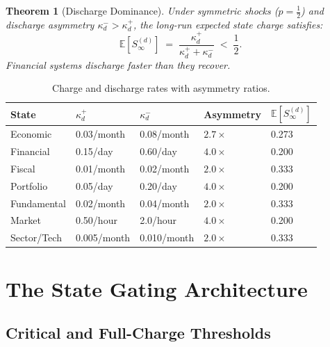 \documentclass[12pt,openany]{book}
\newcommand{\E}{\mathbb{E}}
\numberwithin{equation}{chapter}
\theoremstyle{plain}
\newtheorem{theorem}{Theorem}[chapter]
\theoremstyle{definition}
\theoremstyle{remark}
\def\mathcal#1{#1}%
\begin{document}
\begin{theorem}[Discharge Dominance]
\label{thm:discharge-dominance}
Under symmetric shocks ($p = \tfrac{1}{2}$) and discharge
asymmetry $\kappa_d^{-} > \kappa_d^{+}$, the long-run expected
state charge satisfies:
\begin{equation}
  \E\!\left[\mathcal{S}_\infty^{(d)}\right]
  \;=\;
  \frac{\kappa_d^{+}}{\kappa_d^{+} + \kappa_d^{-}}
  \;<\; \frac{1}{2}.
  \label{eq:discharge-dominance}
\end{equation}
Financial systems discharge faster than they recover.
\end{theorem}

\begin{table}[H]
\centering
\caption{Charge and discharge rates with asymmetry ratios.}
\label{tab:charge-rates}
\small
\begin{tabularx}{\textwidth}{@{} l l l l l @{}}
\toprule
\textbf{State} & \textbf{$\kappa_d^{+}$} & \textbf{$\kappa_d^{-}$}
  & \textbf{Asymmetry} & \textbf{$\E[\mathcal{S}_\infty^{(d)}]$} \\
\midrule
Economic    & 0.03/month & 0.08/month & $2.7\times$ & 0.273 \\
Financial   & 0.15/day   & 0.60/day   & $4.0\times$ & 0.200 \\
Fiscal      & 0.01/month & 0.02/month & $2.0\times$ & 0.333 \\
Portfolio   & 0.05/day   & 0.20/day   & $4.0\times$ & 0.200 \\
Fundamental & 0.02/month & 0.04/month & $2.0\times$ & 0.333 \\
Market      & 0.50/hour  & 2.0/hour   & $4.0\times$ & 0.200 \\
Sector/Tech & 0.005/month & 0.010/month & $2.0\times$ & 0.333 \\
\bottomrule
\end{tabularx}
\end{table}

\chapter{The State Gating Architecture}
\label{ch:gating}

\section{Critical and Full-Charge Thresholds}
\end{document}
